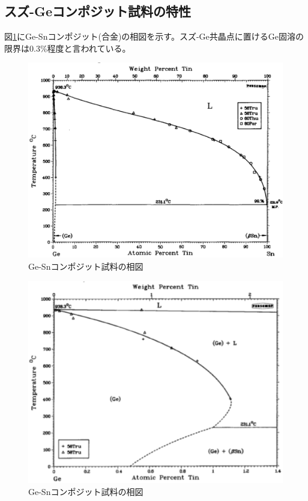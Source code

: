\subsection{スズ-Geコンポジット試料の特性}
図\ref{fig:GeSn_phase}にGe-Snコンポジット(合金)の相図を示す\cite{Olesinski1984}。スズ-Ge共晶点に置けるGe固溶の限界は0.3\%程度と言われている\cite{Thurmond1960}。
\begin{figure}[htb]
    \begin{center}
   \includegraphics[width=150mm]{Introduction/GeSn_phase.eps}
  \end{center}
  \caption{Ge-Snコンポジット試料の相図\cite{Olesinski1984}}
  \label{fig:GeSn_phase}
\end{figure}
\begin{figure}[htb]
    \begin{center}
   \includegraphics[width=130mm]{Introduction/GeSn_phase2.eps}
  \end{center}
  \caption{Ge-Snコンポジット試料の相図\cite{Olesinski1984}}
  \label{fig:GeSn_phase2}
\end{figure}

